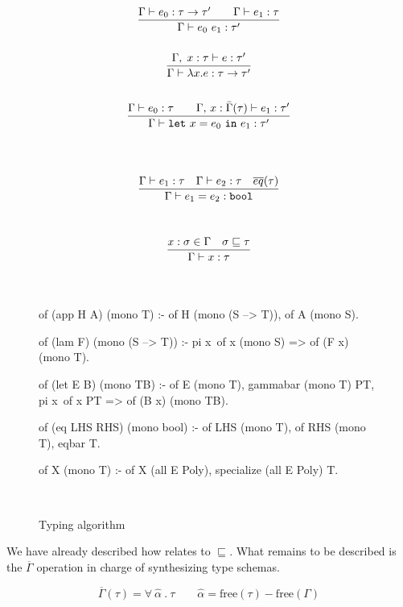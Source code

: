 \documentclass[a4paper, 11pt]{book}
\newenvironment{elpicode}
  {\VerbatimEnvironment~\\\begin{elpibox}\begin{xelpicode}}{\end{xelpicode}
\end{elpibox}\\}
\begin{document}
\begin{figure}[!h]
\begin{minipage}{0.5\textwidth}
$$
\begin{array}{c}
\displaystyle\frac{\Gamma \vdash e_0:\tau \rightarrow \tau' \quad\quad \Gamma \vdash e_1 : \tau }{\Gamma \vdash e_0\ e_1 : \tau'}
\vspace{1.8em}
\\
\displaystyle\frac{\Gamma,\;x:\tau\vdash e:\tau'}{\Gamma \vdash \lambda x.e : \tau \rightarrow \tau'}
\vspace{2.2em}
\\
\displaystyle\frac{\Gamma \vdash e_0:\tau \quad\quad \Gamma,\,x:\bar{\Gamma}(\tau) \vdash e_1:\tau'}{\Gamma \vdash \mathtt{let}\ x = e_0\ \mathtt{in}\ e_1 :  \tau'}
\vspace{4.2em}
\\
\displaystyle\frac{\Gamma \vdash e_1 : \tau \quad \Gamma \vdash e_2 : \tau \quad \overline{eq}(\tau)}{\Gamma \vdash e_1 = e_2: \mathtt{bool}}
\vspace{3.2em}
\\
\displaystyle\frac{x:\sigma \in \Gamma \quad \sigma \sqsubseteq \tau}{\Gamma \vdash x:\tau}
\vspace{0.6em}
\end{array}
$$
\end{minipage}
\begin{minipage}{0.45\textwidth}

\begin{elpicode}
of (app H A) (mono T) :-
  of H (mono (S --> T)),
  of A (mono S).

of (lam F) (mono (S --> T)) :-
  pi x\ of x (mono S) =>
    of (F x) (mono T).

of (let E B) (mono TB) :-
  of E (mono T),
  gammabar (mono T) PT,
  pi x\ of x PT =>
    of (B x) (mono TB).

of (eq LHS RHS) (mono bool) :-
  of LHS (mono T),
  of RHS (mono T),
  eqbar T.

of X (mono T) :-
  of X (all E Poly),
  specialize (all E Poly) T.
\end{elpicode}
\end{minipage}
\caption{Typing algorithm\label{fig:hm}}
\end{figure}

We have already described how  relates to $\sqsubseteq$.
What remains to be described is the $\overline{\Gamma}$ operation
in charge of synthesizing type schemas.

$$
\overline{\Gamma}(\tau) = \forall\ \hat{\alpha}\ .\ \tau \quad\quad \hat{\alpha} = \textrm{free}(\tau) - \textrm{free}(\Gamma)
$$
\end{document}
